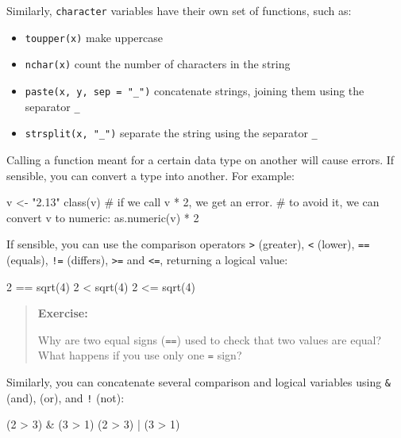 \documentclass[
  letterpaper,
  DIV=11,
  numbers=noendperiod]{scrreprt}
\newenvironment{Shaded}{\begin{snugshade}}{\end{snugshade}}
\newcommand{\NormalTok}[1]{\textcolor[rgb]{0.00,0.23,0.31}{#1}}
\providecommand{\tightlist}{%
  \setlength{\itemsep}{0pt}\setlength{\parskip}{0pt}}\usepackage{longtable,booktabs,array}
\begin{document}
Similarly, \texttt{character} variables have their own set of functions,
such as:

\begin{itemize}
\tightlist
\item
  \texttt{toupper(x)} make uppercase
\item
  \texttt{nchar(x)} count the number of characters in the string
\item
  \texttt{paste(x,\ y,\ sep\ =\ "\_")} concatenate strings, joining them
  using the separator \texttt{\_}
\item
  \texttt{strsplit(x,\ "\_")} separate the string using the separator
  \texttt{\_}
\end{itemize}

Calling a function meant for a certain data type on another will cause
errors. If sensible, you can convert a type into another. For example:

\begin{Shaded}
\begin{Highlighting}[]
\NormalTok{v \textless{}{-} "2.13"}
\NormalTok{class(v)}
\NormalTok{\# if we call v * 2, we get an error.}
\NormalTok{\# to avoid it, we can convert v to numeric:}
\NormalTok{as.numeric(v) * 2 }
\end{Highlighting}
\end{Shaded}

If sensible, you can use the comparison operators
\texttt{\textgreater{}} (greater), \texttt{\textless{}} (lower),
\texttt{==} (equals), \texttt{!=} (differs), \texttt{\textgreater{}=}
and \texttt{\textless{}=}, returning a logical value:

\begin{Shaded}
\begin{Highlighting}[]
\NormalTok{2 == sqrt(4)}
\NormalTok{2 \textless{} sqrt(4)}
\NormalTok{2 \textless{}= sqrt(4)}
\end{Highlighting}
\end{Shaded}

\begin{quote}
\textbf{Exercise:}

Why are two equal signs (\texttt{==}) used to check that two values are
equal? What happens if you use only one \texttt{=} sign?
\end{quote}

Similarly, you can concatenate several comparison and logical variables
using \texttt{\&} (and), \texttt{\textbar{}} (or), and \texttt{!} (not):

\begin{Shaded}
\begin{Highlighting}[]
\NormalTok{(2 \textgreater{} 3) \& (3 \textgreater{} 1)}
\NormalTok{(2 \textgreater{} 3) | (3 \textgreater{} 1)}
\end{Highlighting}
\end{Shaded}
\end{document}
